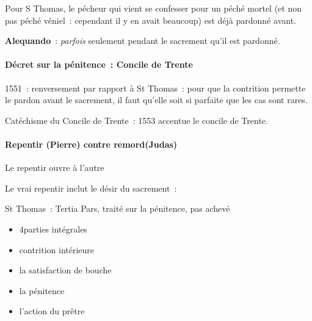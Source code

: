 Pour S Thomas, le pécheur qui vient se confesser pour un péché mortel
(et non pas péché véniel~: cependant il y en avait beaucoup) est déjà
pardonné avant.

\textbf{Alequando}~: \emph{parfois} seulement pendant le sacrement qu'il
est pardonné.

\hypertarget{duxe9cret-sur-la-puxe9nitence-concile-de-trente}{%
\paragraph[Décret sur la pénitence~: Concile de
Trente]{\texorpdfstring{Décret sur la pénitence~:
Concile de
Trente}{Décret sur la pénitence~: Concile de Trente}}\label{duxe9cret-sur-la-puxe9nitence-concile-de-trente}}

1551~: renversement par rapport à St Thomas~: pour que la contrition
permette le pardon avant le sacrement, il faut qu'elle soit si parfaite
que les cas sont rares.

Catéchisme du Concile de Trente~: 1553 accentue le concile de Trente.

\hypertarget{repentir-pierre-contre-remordjudas}{%
\paragraph{Repentir (Pierre) contre
remord(Judas)}\label{repentir-pierre-contre-remordjudas}}

Le repentir ouvre à l'autre

Le vrai repentir inclut le désir du sacrement~:

St Thomas~: Tertia Pars, traité sur la pénitence, pas achevé

\begin{itemize}
\item
   
  4parties intégrales
   
\item
   
  contrition intérieure
   
\item
   
  la satisfaction de bouche
   
\item
   
  la pénitence
   
\item
   
  l'action du prêtre
   
\end{itemize}

